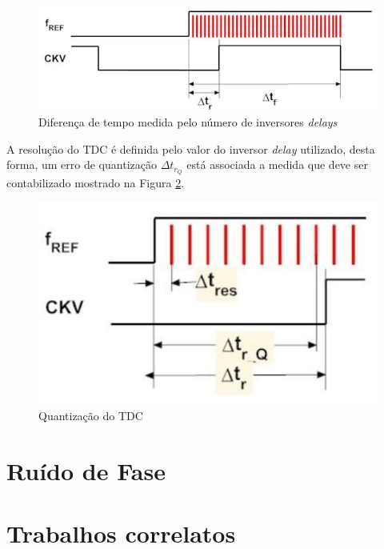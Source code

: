 \begin{figure}[h!]
	\caption{Diferença de tempo medida pelo número de inversores \textit{delays}}
	\begin{center}
		\includegraphics[scale=0.8]{img/tdc_tr_tf.png}
	\end{center}
	\label{fig:tdc_tr_tf}
\end{figure}

A resolução do TDC é definida pelo valor do inversor \textit{delay} utilizado, desta forma, um erro de quantização $\Delta t_{r_Q}$ está associada a medida que deve ser contabilizado mostrado na Figura \ref{fig:tdc_erros_qtd}.

\begin{figure}[h!]
	\caption{Quantização do TDC}
	\begin{center}
		\includegraphics[scale=0.8]{img/tdc_erros_qtd.png}
	\end{center}
	\label{fig:tdc_erros_qtd}
\end{figure}

\section{Ruído de Fase}


\section{Trabalhos correlatos}




